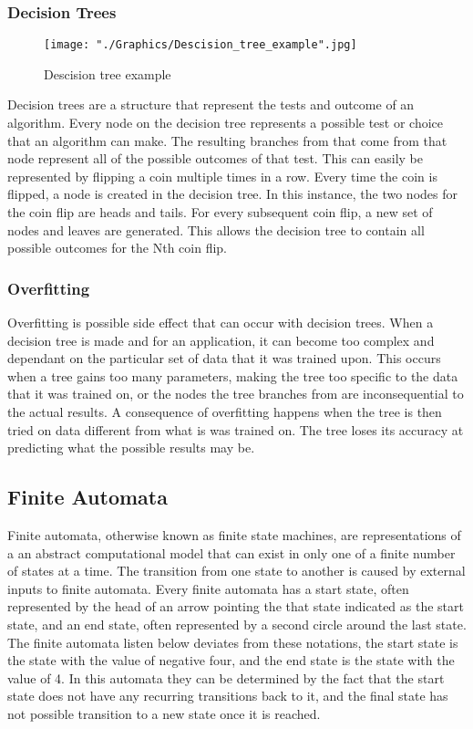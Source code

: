 \documentclass{sig-alternate}
\begin{document}
\subsubsection{Decision Trees}
\label{sec:decision_trees}
\begin{figure}
	\texttt{[image: "./Graphics/Descision\_tree\_example".jpg]}
	\caption{Descision tree example}
	\label{fig:descisiontree}
\end{figure}
	Decision trees are a structure that represent the tests and outcome of an algorithm. Every node on the decision tree represents a possible test or choice that an algorithm can make. The resulting branches from that come from that node represent all of the possible outcomes of that test. This can easily be represented by flipping a coin multiple times in a row. Every time the coin is flipped, a node is created in the decision tree. In this instance, the two nodes for the coin flip are heads and tails. For every subsequent coin flip, a new set of nodes and leaves are generated. This allows the decision tree to contain all possible outcomes for the Nth coin flip.

\subsubsection{Overfitting}
\label{sec:overfitting}
	Overfitting is possible side effect that can occur with decision trees. When a decision tree is made and for an application, it can become too complex and dependant on the particular set of data that it was trained upon. This occurs when a tree gains too many parameters, making the tree too specific to the data that it was trained on, or the nodes the tree branches from are inconsequential to the actual results. A consequence of overfitting happens when the tree is then tried on data different from what is was trained on. The tree loses its accuracy at predicting what the possible results may be.
\subsection{Finite Automata}
\label{sec:finiteautomata}
	Finite automata, otherwise known as finite state machines, are representations of a an abstract computational model that can exist in only one of a finite number of states at a time. The transition from one state to another is caused by external inputs to finite automata. Every finite automata has a start state, often represented by the head of an arrow pointing the that state indicated as the start state, and an end state, often represented by a second circle around the last state. The finite automata listen below deviates from these notations, the start state is the state with the value of negative four, and the end state is the state with the value of 4. In this automata they can be determined by the fact that the start state does not have any recurring transitions back to it, and the final state has not possible transition to a new state once it is reached.
\end{document}
